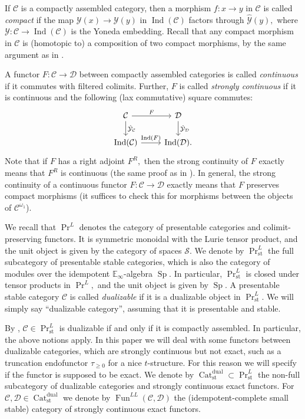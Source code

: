 \documentclass[11pt,leqno]{amsart}
\numberwithin{equation}{section}
\newcommand{\Cat}{\operatorname{Cat}}
\newcommand{\st}{\operatorname{st}}
\newcommand{\dual}{\operatorname{dual}}
\newcommand{\bE}{{\mathbb E}}
\newcommand{\cD}{{\mathcal D}}
\newcommand{\cC}{{\mathcal C}}
\newcommand{\cY}{{\mathcal Y}}
\newcommand{\cS}{{\mathcal S}}
\newcommand{\Fun}{\operatorname{Fun}}
\newcommand{\Sp}{\operatorname{Sp}}
\newcommand{\Ind}{\operatorname{Ind}}
\begin{document}
If $\cC$ is a compactly assembled category, then a morphism $f:x\to y$ in $\cC$ is called {\it compact} if the map $\cY(x)\to \cY(y)$ in $\Ind(\cC)$ factors through $\hat{\cY}(y),$ where $\cY:\cC\to\Ind(\cC)$ is the Yoneda embedding. Recall that any compact morphism in $\cC$ is (homotopic to) a composition of two compact morphisms, by the same argument as in \cite[Corollary 1.41]{E24}.

A functor $F:\cC\to\cD$ between compactly assembled categories is called {\it continuous} if it commutes with filtered colimits. Further, $F$ is called {\it strongly continuous} if it is continuous and the following (lax commutative) square commutes:
\begin{equation*}
\begin{tikzcd}
\cC \ar{r}{F}\ar{d}{\hat{\cY}_{\cC}} & \cD\ar{d}{\hat{\cY}_{\cD}}\\
\Ind(\cC)\ar{r}{\Ind(F)} &\Ind(\cD).
\end{tikzcd}
\end{equation*}
Note that if $F$ has a right adjoint $F^R,$ then the strong continuity of $F$ exactly means that $F^R$ is continuous (the same proof as in \cite[Proposition 1.14]{E24}).
In general, the strong continuity of a continuous functor $F:\cC\to\cD$ exactly means that $F$ preserves compact morphisms (it suffices to check this for morphisms between the objects of $\cC^{\omega_1}$).

We recall that $\Pr^L$ denotes the category of presentable categories and colimit-preserving functors. It is symmetric monoidal with the Lurie tensor product, and the unit object is given by the category of spaces $\cS.$ We denote by $\Pr^L_{\st}$ the full subcategory of presentable stable categories, which is also the category of modules over the idempotent $\bE_{\infty}$-algebra $\Sp.$ In particular, $\Pr^L_{\st}$ is closed under tensor products in $\Pr^L,$ and the unit object is given by $\Sp.$ A presentable stable category $\cC$ is called {\it dualizable} if it is a dualizable object in $\Pr^L_{\st}.$ We will simply say ``dualizable category'', assuming that it is presentable and stable. 

By \cite[Proposition D.7.3.1]{Lur18}, $\cC\in\Pr^L_{\st}$ is dualizable if and only if it is compactly assembled. In particular, the above notions apply. In this paper we will deal with some functors between dualizable categories, which are strongly continuous but not exact, such as a truncation endofunctor $\tau_{\geq 0}$ for a nice $t$-structure. For this reason we will specify if the functor is supposed to be exact. We denote by $\Cat_{\st}^{\dual}\subset\Pr^L_{\st}$ the non-full subcategory of dualizable categories and strongly continuous exact functors. For $\cC,\cD\in\Cat_{\st}^{\dual}$ we denote by $\Fun^{LL}(\cC,\cD)$ the (idempotent-complete small stable) category of strongly continuous exact functors.
\end{document}
